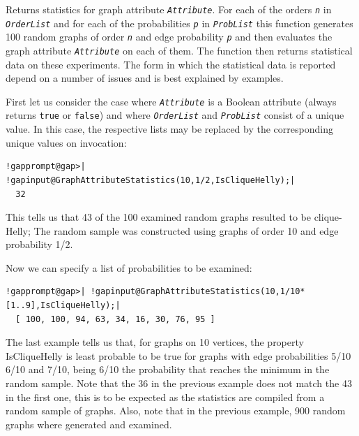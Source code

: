 \documentclass[a4paper,11pt]{report}
\begin{document}
{{{ 

Returns statistics for graph attribute \mbox{\texttt{\mdseries\slshape Attribute}}. For each of the orders \mbox{\texttt{\mdseries\slshape n}} in \mbox{\texttt{\mdseries\slshape OrderList}} and for each of the probabilities \mbox{\texttt{\mdseries\slshape p}} in \mbox{\texttt{\mdseries\slshape ProbList}} this function generates 100 random graphs of order \mbox{\texttt{\mdseries\slshape n}} and edge probability \mbox{\texttt{\mdseries\slshape p}} and then evaluates the graph attribute \mbox{\texttt{\mdseries\slshape Attribute}} on each of them. The function then returns statistical data on these
experiments. The form in which the statistical data is reported depend on a
number of issues and is best explained by examples. 

First let us consider the case where \mbox{\texttt{\mdseries\slshape Attribute}} is a Boolean attribute (always returns \texttt{true} or \texttt{false}) and where \mbox{\texttt{\mdseries\slshape OrderList}} and \mbox{\texttt{\mdseries\slshape ProbList}} consist of a unique value. In this case, the respective lists may be replaced
by the corresponding unique values on invocation: 

 
\begin{Verbatim}[commandchars=!@|,fontsize=\small,frame=single,label=Example]
  !gapprompt@gap>| !gapinput@GraphAttributeStatistics(10,1/2,IsCliqueHelly);|
  32
\end{Verbatim}
 

This tells us that 43 of the 100 examined random graphs resulted to be
clique-Helly; The random sample was constructed using graphs of order 10 and
edge probability 1/2. 

Now we can specify a list of probabilities to be examined: 

 
\begin{Verbatim}[commandchars=!@|,fontsize=\small,frame=single,label=Example]
  !gapprompt@gap>| !gapinput@GraphAttributeStatistics(10,1/10*[1..9],IsCliqueHelly);|
  [ 100, 100, 94, 63, 34, 16, 30, 76, 95 ]
\end{Verbatim}
 

The last example tells us that, for graphs on 10 vertices, the property
IsCliqueHelly is least probable to be true for graphs with edge probabilities
5/10 6/10 and 7/10, being 6/10 the probability that reaches the minimum in the
random sample. Note that the 36 in the previous example does not match the 43
in the first one, this is to be expected as the statistics are compiled from a
random sample of graphs. Also, note that in the previous example, 900 random
graphs where generated and examined. 

}}}
\end{document}
